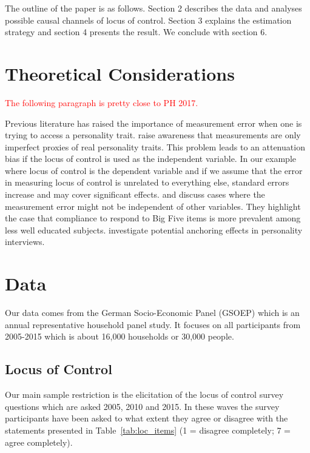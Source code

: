 \documentclass[12pt, a4paper, fleqn, parskip]{scrartcl}
\begin{document}
The outline of the paper is as follows. Section 2 describes the data and
analyses possible causal channels of locus of control. Section 3 explains the
estimation strategy and section 4 presents the result. We conclude with section
6.

\section{Theoretical Considerations} %
\label{sec:theoretical_considerations}

\textcolor{red}{The following paragraph is pretty close to PH 2017.}

Previous literature has raised the importance of measurement error when one is
trying to access a personality trait. \citet{borghans2008} raise awareness that
measurements are only imperfect proxies of real personality traits. This
problem leads to an attenuation bias if the locus of control is used as the
independent variable. In our example where locus of control is the dependent
variable and if we assume that the error in measuring locus of control is
unrelated to everything else, standard errors increase and may cover
significant effects. \citet{rammstedt2010} and \citet{rammstedt2011} discuss
cases where the measurement error might not be independent of other variables.
They highlight the case that compliance to respond to Big Five items is more
prevalent among less well educated subjects. \citet{golsteyn2017} investigate
potential anchoring effects in personality interviews.


\section{Data}

Our data comes from the German Socio-Economic Panel (GSOEP)  \citep{soep2017}
which is an annual representative household panel study. It focuses on all
participants from 2005-2015 which is about 16,000 households or 30,000 people.

\subsection{Locus of Control} %
\label{sub:locus_of_control}

Our main sample restriction is the elicitation of the locus of control survey
questions which are asked 2005, 2010 and 2015. In these waves the
survey participants have been asked to what extent they agree or disagree with
the statements presented in Table~\ref{tab:loc_items} (1 = disagree completely;
7 = agree completely).
\end{document}
